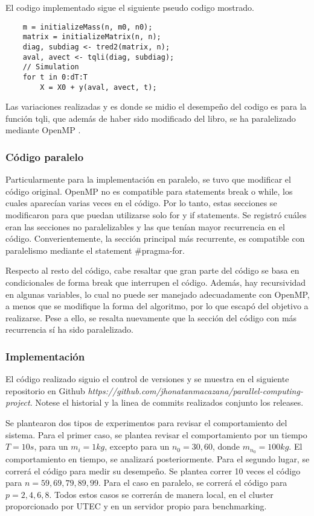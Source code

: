 El codigo implementado sigue el siguiente pseudo codigo mostrado. 
\begin{verbatim}
	m = initializeMass(n, m0, n0);
	matrix = initializeMatrix(n, n);
	diag, subdiag <- tred2(matrix, n);
	aval, avect <- tqli(diag, subdiag);
	// Simulation
	for t in 0:dT:T
		X = X0 + y(aval, avect, t);
\end{verbatim}

Las variaciones realizadas y es donde se midio el desempeño del codigo es para la función tqli, que además de haber sido modificado del libro, se ha paralelizado mediante OpenMP \cite{al2017parallel}.


\subsubsection{Código paralelo}
Particularmente para la implementación en paralelo, se tuvo que modificar el código original. OpenMP no es compatible para statements break o while, los cuales aparecían varias veces en el código. Por lo tanto, estas secciones se modificaron para que puedan utilizarse solo for y if statements. Se registró cuáles eran las secciones no paralelizables y las que tenían mayor recurrencia en el código. Converientemente, la sección principal más recurrente, es compatible con paralelismo mediante el statement \#pragma-for. 

Respecto al resto del código, cabe resaltar que gran parte del código se basa en condicionales de forma break que interrupen el código. Además, hay recursividad en algunas variables, lo cual no puede ser manejado adecuadamente con OpenMP, a menos que se modifique la forma del algoritmo, por lo que escapó del objetivo a realizarse. Pese a ello, se resalta nuevamente que la sección del código con más recurrencia sí ha sido paralelizado.

\subsubsection{Implementación}
El código realizado siguio el control de versiones  y se muestra en el siguiente repositorio en Github \textit{https://github.com/jhonatanmacazana/parallel-computing-project}. Notese el historial y la linea de commits realizados conjunto los releases.

Se plantearon dos tipos de experimentos para revisar el comportamiento del sistema. Para el primer caso, se plantea revisar el comportamiento por un tiempo $T = 10s$, para un $m_i = 1 kg$, excepto para un $n_0 = 30, 60$, donde $m_{n_0} = 100 kg$. El comportamiento en tiempo, se analizará posteriormente. Para el segundo lugar, se correrá el código para medir su desempeño. Se plantea correr 10 veces el código para $n={59,69,79,89,99}$. Para el caso en paralelo, se correrá el código para $p={2,4,6,8}$. Todos estos casos se correrán de manera local, en el cluster proporcionado por UTEC y en un servidor propio para benchmarking.

